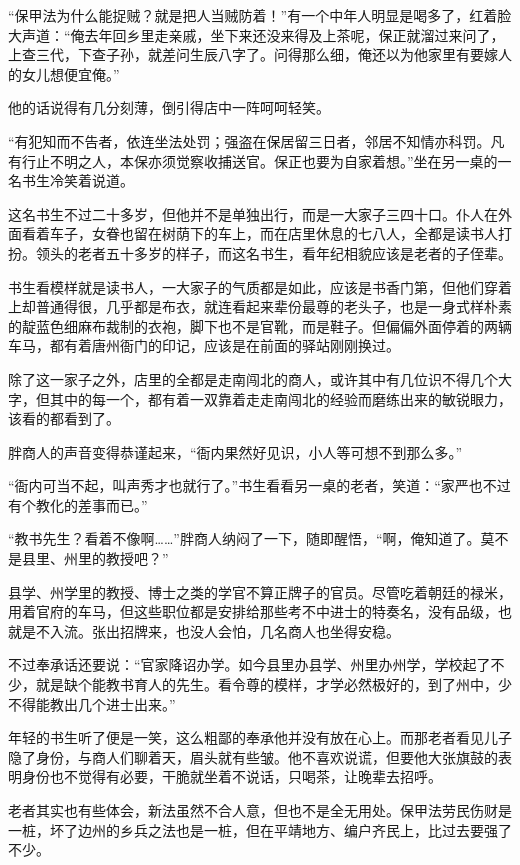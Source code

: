 “保甲法为什么能捉贼？就是把人当贼防着！”有一个中年人明显是喝多了，红着脸大声道：“俺去年回乡里走亲戚，坐下来还没来得及上茶呢，保正就溜过来问了，上查三代，下查子孙，就差问生辰八字了。问得那么细，俺还以为他家里有要嫁人的女儿想便宜俺。”

他的话说得有几分刻薄，倒引得店中一阵呵呵轻笑。

“有犯知而不告者，依连坐法处罚；强盗在保居留三日者，邻居不知情亦科罚。凡有行止不明之人，本保亦须觉察收捕送官。保正也要为自家着想。”坐在另一桌的一名书生冷笑着说道。

这名书生不过二十多岁，但他并不是单独出行，而是一大家子三四十口。仆人在外面看着车子，女眷也留在树荫下的车上，而在店里休息的七八人，全都是读书人打扮。领头的老者五十多岁的样子，而这名书生，看年纪相貌应该是老者的子侄辈。

书生看模样就是读书人，一大家子的气质都是如此，应该是书香门第，但他们穿着上却普通得很，几乎都是布衣，就连看起来辈份最尊的老头子，也是一身式样朴素的靛蓝色细麻布裁制的衣袍，脚下也不是官靴，而是鞋子。但偏偏外面停着的两辆车马，都有着唐州衙门的印记，应该是在前面的驿站刚刚换过。

除了这一家子之外，店里的全都是走南闯北的商人，或许其中有几位识不得几个大字，但其中的每一个，都有着一双靠着走走南闯北的经验而磨练出来的敏锐眼力，该看的都看到了。

胖商人的声音变得恭谨起来，“衙内果然好见识，小人等可想不到那么多。”

“衙内可当不起，叫声秀才也就行了。”书生看看另一桌的老者，笑道：“家严也不过有个教化的差事而已。”

“教书先生？看着不像啊……”胖商人纳闷了一下，随即醒悟，“啊，俺知道了。莫不是县里、州里的教授吧？”

县学、州学里的教授、博士之类的学官不算正牌子的官员。尽管吃着朝廷的禄米，用着官府的车马，但这些职位都是安排给那些考不中进士的特奏名，没有品级，也就是不入流。张出招牌来，也没人会怕，几名商人也坐得安稳。

不过奉承话还要说：“官家降诏办学。如今县里办县学、州里办州学，学校起了不少，就是缺个能教书育人的先生。看令尊的模样，才学必然极好的，到了州中，少不得能教出几个进士出来。”

年轻的书生听了便是一笑，这么粗鄙的奉承他并没有放在心上。而那老者看见儿子隐了身份，与商人们聊着天，眉头就有些皱。他不喜欢说谎，但要他大张旗鼓的表明身份也不觉得有必要，干脆就坐着不说话，只喝茶，让晚辈去招呼。

老者其实也有些体会，新法虽然不合人意，但也不是全无用处。保甲法劳民伤财是一桩，坏了边州的乡兵之法也是一桩，但在平靖地方、编户齐民上，比过去要强了不少。

